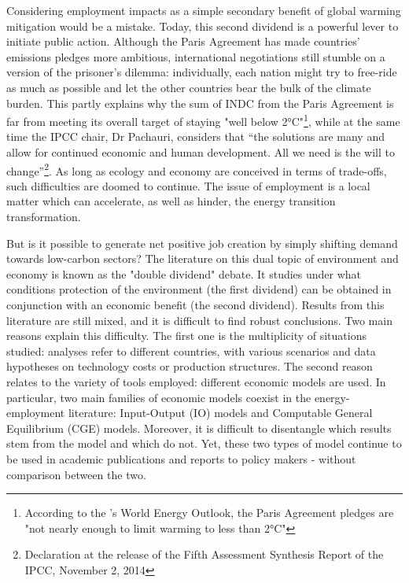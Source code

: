 Considering employment impacts as a simple secondary benefit of global warming mitigation would be a mistake. Today, this second dividend is a powerful lever to initiate public action. Although the Paris Agreement has made countries' emissions pledges more ambitious, international negotiations still stumble on a version of the prisoner's dilemma: individually, each nation might try to free-ride as much as possible and let the other countries bear the bulk of the climate burden. This partly explains why the sum of INDC from the Paris Agreement is far from meeting its overall target of staying "well below 2°C"\footnote{According to the \citet{OECD/IEA2016}'s World Energy Outlook, the Paris Agreement pledges are "not nearly enough to limit warming to less than 2°C"}, while at the same time the IPCC chair, Dr Pachauri, considers that “the solutions are many and allow for continued economic and human development. All we need is the will to change”\footnote{Declaration at the release of the Fifth Assessment Synthesis Report of the IPCC, November 2, 2014}.
As long as ecology and economy are conceived in terms of trade-offs, such difficulties are doomed to continue. The issue of employment is a local matter which can accelerate, as well as hinder, the energy transition transformation. 

But is it possible to generate net positive job creation by simply shifting demand towards low-carbon sectors? 
The literature on this dual topic of environment and economy is known as the "double dividend" debate. It studies under what conditions protection of the environment (the first dividend) can be obtained in conjunction with an economic benefit (the second dividend).
Results from this literature are still mixed, and it is difficult to find robust conclusions. Two main reasons explain this difficulty. The first one is the multiplicity of situations studied: analyses refer to different countries, with various scenarios and data hypotheses on technology costs or production structures. The second reason relates to the variety of tools employed: different economic models are used. In particular, two main families of economic models coexist in the energy-employment literature: Input-Output (IO) models and Computable General Equilibrium (CGE) models. Moreover, it is difficult to disentangle which results stem from the model and which do not. Yet, these two types of model continue to be used in academic publications and reports to policy makers - without comparison between the two.

